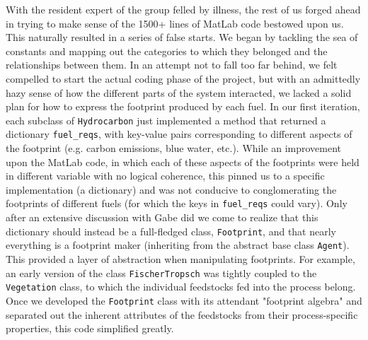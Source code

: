 \documentclass{article}
\begin{document}
With the resident expert of the group felled by illness, the rest of us forged ahead in trying to make sense of the 1500+ lines of MatLab code bestowed upon us. This naturally resulted in a series of false starts. We began by tackling the sea of constants and mapping out the categories to which they belonged and the relationships between them. In an attempt not to fall too far behind, we felt compelled to start the actual coding phase of the project, but with an admittedly hazy sense of how the different parts of the system interacted, we lacked a solid plan for how to express the footprint produced by each fuel. In our first iteration, each subclass of \texttt{Hydrocarbon} just implemented a method that returned a dictionary \texttt{fuel\_reqs}, with key-value pairs corresponding to different aspects of the footprint (e.g. carbon emissions, blue water, etc.). While an improvement upon the MatLab code, in which each of these aspects of the footprints were held in different variable with no logical coherence, this pinned us to a specific implementation (a dictionary) and was not conducive to conglomerating the footprints of different fuels (for which the keys in \texttt{fuel\_reqs} could vary).  Only after an extensive discussion with Gabe did we come to realize that this dictionary should instead be a full-fledged class, \texttt{Footprint}, and that nearly everything is a footprint maker (inheriting from the abstract base class \texttt{Agent}). This provided a layer of abstraction when manipulating footprints. For example, an early version of the class \texttt{FischerTropsch} was tightly coupled to the \texttt{Vegetation} class, to which the individual feedstocks fed into the process belong. Once we developed the \texttt{Footprint} class with its attendant "footprint algebra" and separated out the inherent attributes of the feedstocks from their process-specific properties, this code simplified greatly.
\end{document}
